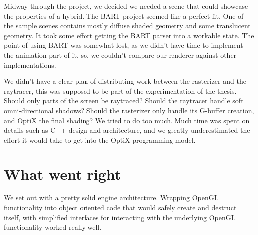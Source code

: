 Midway through the project, we decided we needed a scene that could showcase the properties of a hybrid. The BART project seemed like a perfect fit. One of the sample scenes contains mostly diffuse shaded geometry and some translucent geometry. It took some effort getting the BART parser into a workable state. The point of using BART was somewhat lost, as we didn't have time to implement the animation part of it, so, we couldn't compare our renderer against other implementations.

We didn't have a clear plan of distributing work between the rasterizer and the raytracer, this was supposed to be part of the experimentation of the thesis. Should only parts of the screen be raytraced? Should the raytracer handle soft omni-directional shadows? Should the rasterizer only handle its G-buffer creation, and OptiX the final shading? We tried to do too much. Much time was spent on details such as C++ design and architecture, and we greatly underestimated the effort it would take to get into the OptiX programming model.

\section{What went right}
We set out with a pretty solid engine architecture. Wrapping OpenGL functionality into object oriented code that would safely create and destruct itself, with simplified interfaces for interacting with the underlying OpenGL functionality worked really well.

